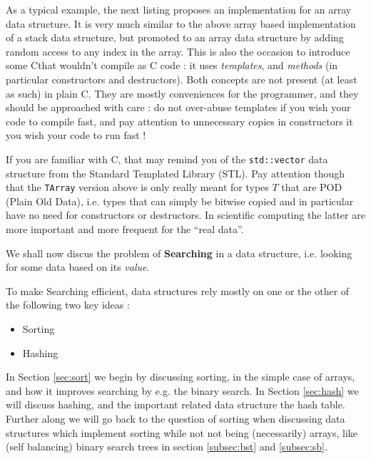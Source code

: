 \documentclass[12pt]{article}
\theoremstyle{plain}
\theoremstyle{remark}
\newcommand{\cpp}{C\nolinebreak\hspace{-.05em}\raisebox{.4ex}{\tiny\bf +}\nolinebreak\hspace{-.10em}\raisebox{.4ex}{\tiny\bf +}}
\begin{document}
\medskip

As a typical example, the next listing proposes an implementation for an array
data structure. It is very much similar to the above array based implementation 
of a stack data structure, but promoted to an array data structure by adding 
random access to any index in the array. This is also the occasion to introduce some
\cpp that wouldn't compile as C code : it uses {\it templates}, and {\it methods} (in particular
constructors and destructors). Both concepts are not present (at least
as such) in plain C. They are mostly conveniences for the programmer, and 
they should be approached with care : do not over-abuse templates if you wish 
your code to compile fast, and pay attention to unnecessary copies in constructors 
it you wish your code to run fast !



If you are familiar with \cpp, that may remind you of the {\tt std::vector} data
structure from the Standard Templated Library (STL). Pay attention though that
the {\tt TArray} version above is only really meant for types $T$ that are POD 
(Plain Old Data), i.e. types that can simply be bitwise copied and in particular 
have no need for constructors or destructors. In scientific computing the latter
are more important and more frequent for the ``real data''.



\pagebreak

We shall now discus the problem of {\bf Searching} in a data 
structure, i.e. looking for some data based on its {\it value}. 

\medskip

To make Searching efficient, data structures rely mostly on one or the other
of the following two key ideas :

\begin{itemize}
	\item Sorting
	\item Hashing
\end{itemize}

In Section \ref{sec:sort} we begin by discussing sorting, in the simple case 
of arrays, and how it improves searching by e.g. the binary search. 
In Section \ref{sec:hash} we will discuss hashing, and
the important related data structure the hash table. Further along we will go 
back to the question of sorting when discussing data structures which implement 
sorting while not not being (necessarily) arrays, like (self balancing) 
binary search trees in section \ref{subsec:bst} and \ref{subsec:sb}.
\end{document}
